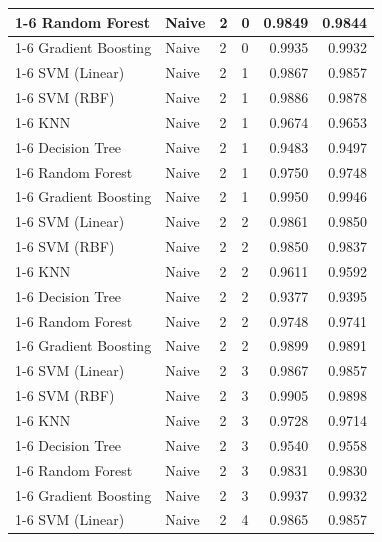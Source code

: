 \begin{table}
\begin{tabular}{llllrr}
\cline{1-6} \cline{2-6} \cline{3-6}
Random Forest & Naive & 2 & 0 & 0.9849 & 0.9844 \\
\cline{1-6} \cline{2-6} \cline{3-6}
Gradient Boosting & Naive & 2 & 0 & 0.9935 & 0.9932 \\
\cline{1-6} \cline{2-6} \cline{3-6}
SVM (Linear) & Naive & 2 & 1 & 0.9867 & 0.9857 \\
\cline{1-6} \cline{2-6} \cline{3-6}
SVM (RBF) & Naive & 2 & 1 & 0.9886 & 0.9878 \\
\cline{1-6} \cline{2-6} \cline{3-6}
KNN & Naive & 2 & 1 & 0.9674 & 0.9653 \\
\cline{1-6} \cline{2-6} \cline{3-6}
Decision Tree & Naive & 2 & 1 & 0.9483 & 0.9497 \\
\cline{1-6} \cline{2-6} \cline{3-6}
Random Forest & Naive & 2 & 1 & 0.9750 & 0.9748 \\
\cline{1-6} \cline{2-6} \cline{3-6}
Gradient Boosting & Naive & 2 & 1 & 0.9950 & 0.9946 \\
\cline{1-6} \cline{2-6} \cline{3-6}
SVM (Linear) & Naive & 2 & 2 & 0.9861 & 0.9850 \\
\cline{1-6} \cline{2-6} \cline{3-6}
SVM (RBF) & Naive & 2 & 2 & 0.9850 & 0.9837 \\
\cline{1-6} \cline{2-6} \cline{3-6}
KNN & Naive & 2 & 2 & 0.9611 & 0.9592 \\
\cline{1-6} \cline{2-6} \cline{3-6}
Decision Tree & Naive & 2 & 2 & 0.9377 & 0.9395 \\
\cline{1-6} \cline{2-6} \cline{3-6}
Random Forest & Naive & 2 & 2 & 0.9748 & 0.9741 \\
\cline{1-6} \cline{2-6} \cline{3-6}
Gradient Boosting & Naive & 2 & 2 & 0.9899 & 0.9891 \\
\cline{1-6} \cline{2-6} \cline{3-6}
SVM (Linear) & Naive & 2 & 3 & 0.9867 & 0.9857 \\
\cline{1-6} \cline{2-6} \cline{3-6}
SVM (RBF) & Naive & 2 & 3 & 0.9905 & 0.9898 \\
\cline{1-6} \cline{2-6} \cline{3-6}
KNN & Naive & 2 & 3 & 0.9728 & 0.9714 \\
\cline{1-6} \cline{2-6} \cline{3-6}
Decision Tree & Naive & 2 & 3 & 0.9540 & 0.9558 \\
\cline{1-6} \cline{2-6} \cline{3-6}
Random Forest & Naive & 2 & 3 & 0.9831 & 0.9830 \\
\cline{1-6} \cline{2-6} \cline{3-6}
Gradient Boosting & Naive & 2 & 3 & 0.9937 & 0.9932 \\
\cline{1-6} \cline{2-6} \cline{3-6}
SVM (Linear) & Naive & 2 & 4 & 0.9865 & 0.9857 \\

\end{tabular}
\end{table}
